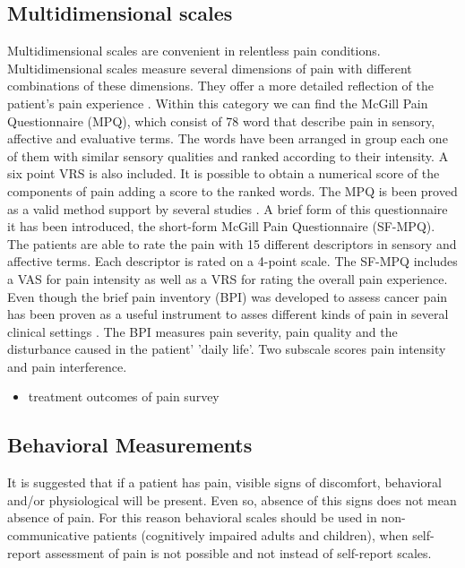  \subsection{Multidimensional scales}
 Multidimensional scales are convenient in relentless pain conditions. Multidimensional scales measure several dimensions of pain with different combinations of these dimensions. They offer a more detailed reflection of the patient's pain experience \cite{art and science}. Within this category we can find the McGill Pain Questionnaire (MPQ), which consist of 78 word that describe pain in sensory, affective and evaluative terms. The words have been arranged in group each one of them with similar sensory qualities and ranked according to their intensity. A six point VRS is also included. It is possible to obtain a numerical score of the components of pain adding a score to the ranked words. The MPQ is been proved as a valid method support by several studies \cite{libro pain}. A brief form of this questionnaire it has been introduced, the short-form McGill Pain Questionnaire (SF-MPQ). The patients are able to rate the pain with 15 different descriptors in sensory and affective terms. Each descriptor is rated on a 4-point scale. The SF-MPQ includes a VAS for pain intensity as well as a VRS for rating the overall pain experience. Even though the brief pain inventory (BPI) was developed to assess cancer pain has been proven as a useful instrument to asses different kinds of pain in several clinical settings \cite{libro pain}. The BPI measures pain severity, pain quality and the disturbance caused in the patient' 'daily life'. Two subscale scores pain intensity and pain interference.  

\begin{itemize}

\item treatment outcomes of pain survey
\end{itemize}
\subsection{Behavioral Measurements}
It is suggested that if a patient has pain, visible signs of discomfort, behavioral and/or physiological will be present. Even so, absence of this signs does not mean absence of pain. For this reason behavioral scales should be used in non-communicative patients (cognitively impaired adults and children), when self-report assessment of pain is not possible and not instead of self-report scales.\cite{referncia buscar}
